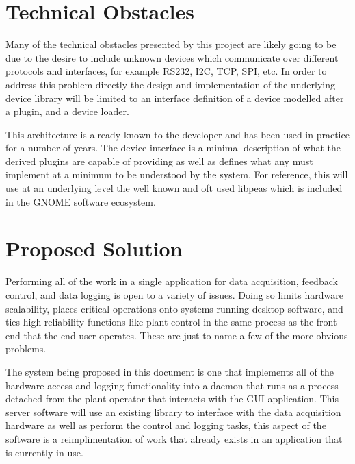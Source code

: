 \documentclass[11pt]{article}
\begin{document}
  \section{Technical Obstacles}\label{sec:tech-obstacles}

    Many of the technical obstacles presented by this project are likely going
    to be due to the desire to include unknown devices which communicate over
    different protocols and interfaces, for example RS232, I2C, TCP, SPI, etc.
    In order to address this problem directly the design and implementation of
    the underlying device library will be limited to an interface definition
    of a device modelled after a plugin, and a device loader.

    This architecture is already known to the developer and has been used in
    practice for a number of years. The device interface is a minimal
    description of what the derived plugins are capable of providing as well
    as defines what any must implement at a minimum to be understood by the
    system. For reference, this will use at an underlying level the well known
    and oft used libpeas which is included in the GNOME software ecosystem.

  \section{Proposed Solution}\label{sec:soln}

    Performing all of the work in a single application for data acquisition,
    feedback control, and data logging is open to a variety of issues. Doing so
    limits hardware scalability, places critical operations onto systems running
    desktop software, and ties high reliability functions like plant control in
    the same process as the front end that the end user operates. These are just
    to name a few of the more obvious problems.

    The system being proposed in this document is one that implements all of
    the hardware access and logging functionality into a daemon that runs as a
    process detached from the plant operator that interacts with the GUI
    application. This server software will use an existing library to interface
    with the data acquisition hardware as well as perform the control and
    logging tasks, this aspect of the software is a reimplimentation of work
    that already exists in an application that is currently in use.
\end{document}
